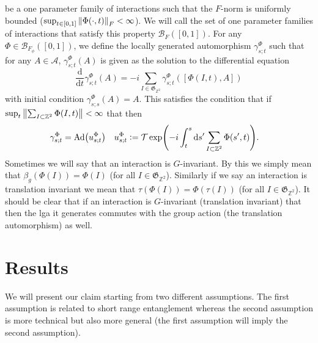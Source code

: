\documentclass[12pt,a4paper,twoside]{article}
\renewcommand{\d}{\text{d}}
\newcommand{\defeq}{\vcentcolon=}
\let\originalleft\left
\let\originalright\right
\renewcommand{\left}{\mathopen{}\mathclose\bgroup\originalleft}
\renewcommand{\right}{\aftergroup\egroup\originalright}
\newcommand{\BB}{\mathcal B}
\newcommand{\ZZ}{\mathbb Z}
\renewcommand{\AA}{\mathcal A}
\newcommand{\Ad}[1]{\textrm{Ad}\left(#1\right)}
\theoremstyle{definition}
\numberwithin{equation}{section}
\begin{document}
be a one parameter family of interactions such that the $F$-norm is uniformly bounded ($\sup_{t\in[0,1]}\norm{\Phi(\cdot,t)}_F<\infty$). We will call the set of one parameter families of interactions that satisfy this property $\BB_{F}([0,1])$. For any $\Phi\in\BB_{F_\phi}([0,1])$, we define the locally generated automorphism $\gamma^{\Phi}_{s;t}$ such that for any $A\in\AA$, $\gamma^{\Phi}_{s;t}(A)$ is given as the solution to the differential equation
\begin{equation}
	\frac{\d}{\d t}\gamma^{\Phi}_{s;t}(A)=-i\sum_{I\in\mathfrak{G}_{\ZZ^2}}\gamma^{\Phi}_{s;t}([\Phi(I,t),A])
\end{equation}
with initial condition $\gamma^{\Phi}_{s;s}(A)=A$. This satisfies the condition that if $\sup_t\norm{\sum_{I\subset\ZZ^2}\Phi(I,t)}<\infty$ that then
\begin{align}
	\gamma^\Phi_{s;t}&=\Ad{u^\Phi_{s;t}}&u^\Phi_{s;t}&\defeq\mathcal{T}\exp(-i\int_t^s\d s'\sum_{I\subset\ZZ^2}\Phi(s',t)).
\end{align}
Sometimes we will say that an interaction is $G$-invariant. By this we simply mean that $\beta_g(\Phi(I))=\Phi(I)$ (for all $I\in\mathfrak{G}_{\ZZ^2}$). Similarly if we say an interaction is translation invariant we mean that $\tau(\Phi(I))=\Phi(\tau(I))$ (for all $I\in\mathfrak{G}_{\ZZ^2}$). It should be clear that if an interaction is $G$-invariant (translation invariant) that then the lga it generates commutes with the group action (the translation automorphism) as well.
\section{Results}
We will present our claim starting from two different assumptions. The first assumption is related to short range entanglement whereas the second assumption is more technical but also more general (the first assumption will imply the second assumption).
\end{document}
